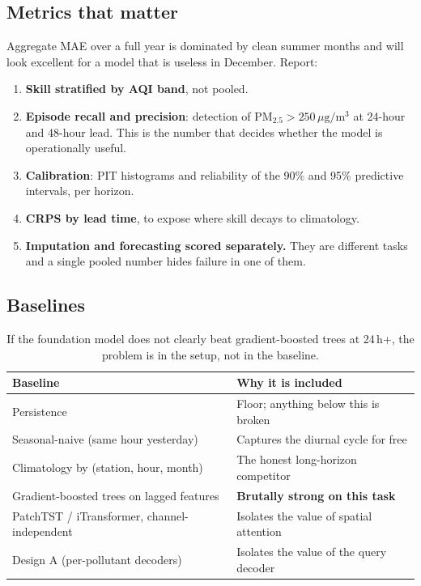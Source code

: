 \documentclass[11pt,a4paper]{article}
\begin{document}
\subsection{Metrics that matter}

Aggregate MAE over a full year is dominated by clean summer months and will look
excellent for a model that is useless in December. Report:

\begin{enumerate}[leftmargin=1.4em]
\item \textbf{Skill stratified by AQI band}, not pooled.
\item \textbf{Episode recall and precision}: detection of
PM$_{2.5}>250\,\mu\text{g}/\text{m}^3$ at 24-hour and 48-hour lead. This is the
number that decides whether the model is operationally useful.
\item \textbf{Calibration}: PIT histograms and reliability of the 90\% and 95\%
predictive intervals, per horizon.
\item \textbf{CRPS by lead time}, to expose where skill decays to climatology.
\item \textbf{Imputation and forecasting scored separately.} They are different
tasks and a single pooled number hides failure in one of them.
\end{enumerate}

\subsection{Baselines}

\begin{table}[h]
\centering
\small
\begin{tabular}{@{}ll@{}}
\toprule
Baseline & Why it is included \\
\midrule
Persistence & Floor; anything below this is broken \\
Seasonal-naive (same hour yesterday) & Captures the diurnal cycle for free \\
Climatology by (station, hour, month) & The honest long-horizon competitor \\
Gradient-boosted trees on lagged features & \textbf{Brutally strong on this task} \\
PatchTST / iTransformer, channel-independent & Isolates the value of spatial attention \\
Design A (per-pollutant decoders) & Isolates the value of the query decoder \\
\bottomrule
\end{tabular}
\caption{If the foundation model does not clearly beat gradient-boosted trees at
24\,h+, the problem is in the setup, not in the baseline.}
\end{table}
\end{document}
